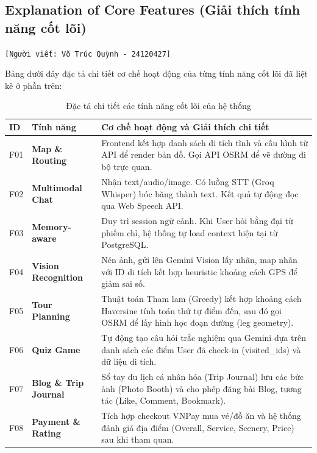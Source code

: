\subsection{Explanation of Core Features (Giải thích tính năng cốt lõi)}
\texttt{[Người viết: Võ Trúc Quỳnh - 24120427]}


Bảng dưới đây đặc tả chi tiết cơ chế hoạt động của từng tính năng cốt lõi đã liệt kê ở phần trên:

\begin{table}[H]
    \centering
    \renewcommand{\arraystretch}{1.4}
    \begin{tabular}{|p{0.8cm}|p{3.5cm}|p{10.2cm}|}
        \hline
        \textbf{ID} & \textbf{Tính năng} & \textbf{Cơ chế hoạt động và Giải thích chi tiết} \\ \hline
        F01 & \textbf{Map \& Routing} & Frontend kết hợp danh sách di tích tĩnh và cấu hình từ API để render bản đồ. Gọi API OSRM để vẽ đường đi bộ trực quan. \\ \hline
        F02 & \textbf{Multimodal Chat} & Nhận text/audio/image. Có luồng STT (Groq Whisper) bóc băng thành text. Kết quả tự động đọc qua Web Speech API. \\ \hline
        F03 & \textbf{Memory-aware} & Duy trì session ngữ cảnh. Khi User hỏi bằng đại từ phiếm chỉ, hệ thống tự load context hiện tại từ PostgreSQL. \\ \hline
        F04 & \textbf{Vision Recognition} & Nén ảnh, gửi lên Gemini Vision lấy nhãn, map nhãn với ID di tích kết hợp heuristic khoảng cách GPS để giảm sai số. \\ \hline
        F05 & \textbf{Tour Planning} & Thuật toán Tham lam (Greedy) kết hợp khoảng cách Haversine tính toán thứ tự điểm đến, sau đó gọi OSRM để lấy hình học đoạn đường (leg geometry). \\ \hline
        F06 & \textbf{Quiz Game} & Tự động tạo câu hỏi trắc nghiệm qua Gemini dựa trên danh sách các điểm User đã check-in (visited\_ids) và dữ liệu di tích. \\ \hline
        F07 & \textbf{Blog \& Trip Journal} & Sổ tay du lịch cá nhân hóa (Trip Journal) lưu các bức ảnh (Photo Booth) và cho phép đăng bài Blog, tương tác (Like, Comment, Bookmark). \\ \hline
        F08 & \textbf{Payment \& Rating} & Tích hợp checkout VNPay mua vé/đồ ăn và hệ thống đánh giá địa điểm (Overall, Service, Scenery, Price) sau khi tham quan. \\ \hline
    \end{tabular}
    \caption{Đặc tả chi tiết các tính năng cốt lõi của hệ thống}
\end{table}

